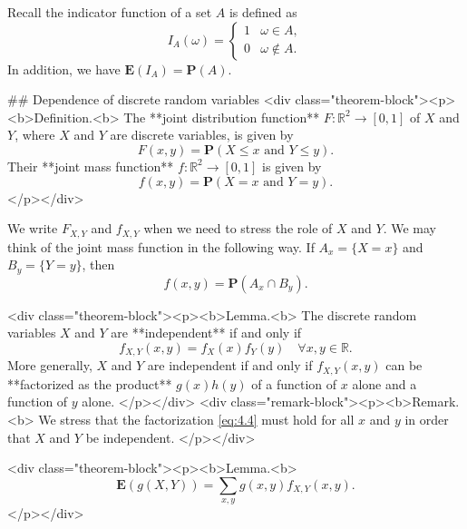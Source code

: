 Recall the indicator function of a set $A$ is defined as
$$\begin{equation}
    I_A(\omega) = \begin{cases} 1 & \omega \in A, \\
    0 & \omega \not\in A. \end{cases}
\end{equation}$$
In addition, we have $\mathbf{E}(I_A) = \mathbf{P}(A)$.


## Dependence of discrete random variables
<div class="theorem-block"><p><b>Definition.<b> 
The **joint distribution function** $F:\mathbb{R}^2 \to [0,1]$ of $X$ and $Y$, where $X$ and $Y$ are discrete variables, is given by 
$$\begin{equation}
    F(x, y) = \mathbf{P}(X\leq x \text{ and } Y \leq y). 
\end{equation}$$
Their **joint mass function** $f:\mathbb{R}^2 \to [0,1]$ is given by 
$$\begin{equation}
    f(x,y) = \mathbf{P}(X = x \text{ and } Y = y). 
\end{equation}$$
</p></div>

We write $F_{X,Y}$ and $f_{X,Y}$ when we need to stress the role of $X$ and $Y$. We may think of the joint mass function in the following way. If $A_x = \{X = x\}$ and $B_y = \{Y = y\}$, then 
$$\begin{equation}
    f(x,y) = \mathbf{P}(A_x \cap B_y).
\end{equation}$$

<div class="theorem-block"><p><b>Lemma.<b> 
The discrete random variables $X$ and $Y$ are **independent** if and only if 
$$$$$$$$\begin{equation}
    \label{eq:4.4}
    \tag{4-4}
    f_{X,Y}(x,y) = f_X(x)f_Y(y) \quad \forall x,y \in \mathbb{R}.
\end{equation}$$$$$$$$
More generally, $X$ and $Y$ are independent if and only if $f_{X,Y}(x, y)$ can be **factorized as the product** $g(x)h (y)$ of a function of $x$ alone and a function of $y$ alone. 
</p></div>
<div class="remark-block"><p><b>Remark.<b> 
We stress that the factorization \eqref{eq:4.4} must hold for all $x$ and $y$ in order that $X$ and $Y$ be independent. 
</p></div>

<div class="theorem-block"><p><b>Lemma.<b> 
$$\begin{equation}
    \mathbf{E}(g(X, Y))=\sum_{x, y} g(x, y) f_{X, Y}(x, y).
\end{equation}$$
</p></div>

